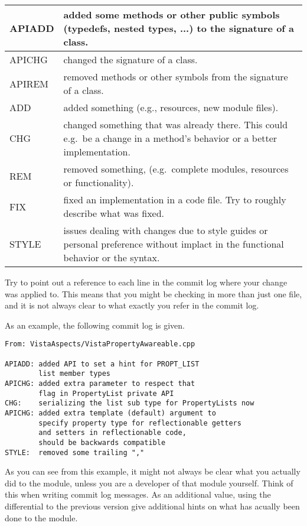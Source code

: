 \begin{tabular}{|l|p{12cm}|}\hline
APIADD   & added some methods or other public symbols (typedefs, nested types, ...) to the signature of a class.\\\hline
APICHG   & changed the signature of a class.\\\hline
APIREM   & removed methods or other symbols from the signature of a class.\\\hline
ADD      & added something (e.g., resources, new module files).\\\hline
CHG      & changed something that was already there.
           This could e.g.\ be a change in a method's behavior or a better implementation.\\\hline
REM      & removed something, (e.g.\ complete modules, resources or functionality).\\\hline
FIX      & fixed an implementation in a code file.
           Try to roughly describe what was fixed.\\\hline
STYLE    & issues dealing with changes due to style guides or personal preference without implact in the functional behavior or the syntax.\\\hline
\end{tabular}

Try to point out a reference to each line in the commit log where your change was applied to.
This means that you might be checking in more than just one file, and it is not always clear to what exactly you refer in the commit log.

As an example, the following commit log is given.
\begin{verbatim}
From: VistaAspects/VistaPropertyAwareable.cpp

APIADD: added API to set a hint for PROPT_LIST 
        list member types
APICHG: added extra parameter to respect that 
        flag in PropertyList private API
CHG:    serializing the list sub type for PropertyLists now
APICHG: added extra template (default) argument to 
        specify property type for reflectionable getters 
        and setters in reflectionable code, 
        should be backwards compatible
STYLE:  removed some trailing ","
\end{verbatim}

As you can see from this example, it might not always be clear what you actually did to the module, unless you are a developer of that module yourself.
Think of this when writing commit log messages.
As an additional value, using the differential to the previous version give additional hints on what has acually been done to the module.


